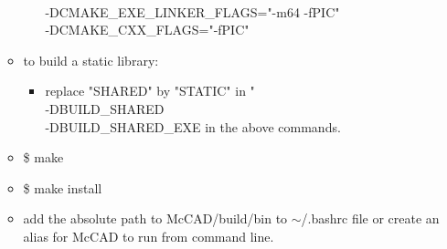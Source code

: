 \documentclass[12pt, a4paper, titlepage]{article}
\begin{document}
\begin{itemize}
\begin{itemize}
\begin{itemize}
			\\-DCMAKE\_EXE\_LINKER\_FLAGS="-m64 -fPIC" \\ -DCMAKE\_CXX\_FLAGS="-fPIC"
		  \end{itemize}
		\item to build a static library:
		\begin{itemize}
			\item replace "SHARED" by "STATIC" in "\\-DBUILD\_SHARED \\-DBUILD\_SHARED\_EXE in the above commands.
		\end{itemize}
		\item \$ make
		\item \$ make install
		\item add the absolute path to McCAD/build/bin to $\sim$/.bashrc file or create an alias for McCAD to run from command line.
	  \end{itemize}
    \end{itemize}
\end{document}
